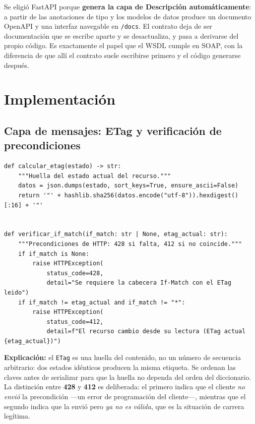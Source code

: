 \documentclass[12pt]{article}
\begin{document}
Se eligió FastAPI porque \textbf{genera la capa de Descripción automáticamente}: a partir de las anotaciones de tipo y los modelos de datos produce un documento OpenAPI y una interfaz navegable en \texttt{/docs}. El contrato deja de ser documentación que se escribe aparte y se desactualiza, y pasa a derivarse del propio código. Es exactamente el papel que el WSDL cumple en SOAP, con la diferencia de que allí el contrato suele escribirse primero y el código generarse después.

\section{Implementación}

\subsection{Capa de mensajes: ETag y verificación de precondiciones}

\begin{lstlisting}[caption={Cálculo de la versión y comprobación (comun.py)}]
def calcular_etag(estado) -> str:
    """Huella del estado actual del recurso."""
    datos = json.dumps(estado, sort_keys=True, ensure_ascii=False)
    return '"' + hashlib.sha256(datos.encode("utf-8")).hexdigest()[:16] + '"'


def verificar_if_match(if_match: str | None, etag_actual: str):
    """Precondiciones de HTTP: 428 si falta, 412 si no coincide."""
    if if_match is None:
        raise HTTPException(
            status_code=428,
            detail="Se requiere la cabecera If-Match con el ETag leido")
    if if_match != etag_actual and if_match != "*":
        raise HTTPException(
            status_code=412,
            detail=f"El recurso cambio desde su lectura (ETag actual {etag_actual})")
\end{lstlisting}

\noindent\textbf{Explicación:} el \texttt{ETag} es una huella del contenido, no un número de secuencia arbitrario: dos estados idénticos producen la misma etiqueta. Se ordenan las claves antes de serializar para que la huella no dependa del orden del diccionario. La distinción entre \textbf{428} y \textbf{412} es deliberada: el primero indica que el cliente \textit{no envió} la precondición —un error de programación del cliente—, mientras que el segundo indica que la envió pero \textit{ya no es válida}, que es la situación de carrera legítima.
\end{document}
